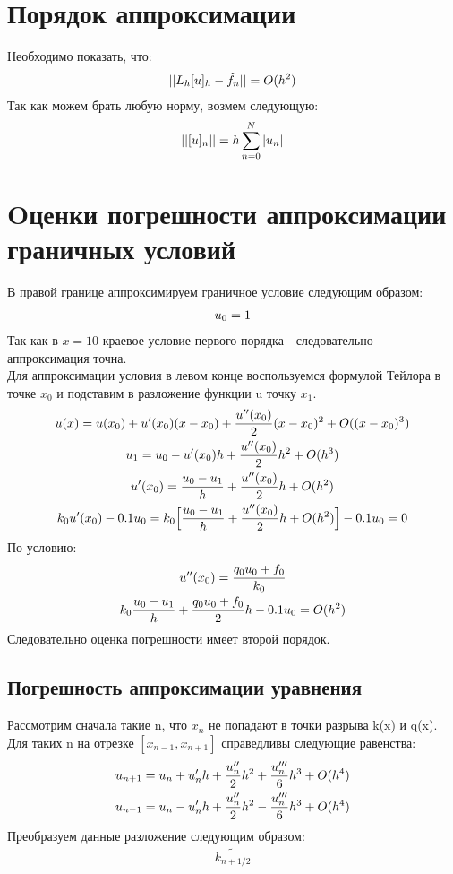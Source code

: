\documentclass[titlepage]{article}
\begin{document}
\section{Порядок аппроксимации}
	Необходимо показать, что:
\begin{gather}
	\notag ||L_h[u]_h - \tilde{f_n}|| = O(h^2)
\end{gather}
Так как можем брать любую норму, возмем следующую:
\begin{gather}
	\notag ||[u]_n|| = h\sum_{n = 0}^{N}|u_n|
\end{gather}
\section{Oценки погрешности аппроксимации граничных условий}
В правой границе аппроксимируем граничное условие следующим образом:
\begin{gather}
	\notag u_0 = 1
\end{gather}
Так как в $x = 10$ краевое условие первого порядка - следовательно аппроксимация точна.\\
Для аппроксимации условия в левом конце воспользуемся формулой Тейлора в точке $x_0$ и подставим в разложение функции u точку $x_1$.
\begin{gather}
	\notag u(x) = u(x_0) + u'(x_0)(x - x_0) + \frac{u''(x_0)}{2}(x - x_0)^2 + O((x -x_0)^3) \\
	\notag u_1 = u_0 - u'(x_0)h + \frac{u''(x_0)}{2}h^2 + O(h^3)\\
	\notag u'(x_0) = \frac{u_0 - u_1}{h} + \frac{u''(x_0)}{2}h + O(h^2)\\
	\notag k_0u'(x_0) - 0.1u_0 = k_0\Big[\frac{u_0 - u_1}{h} + \frac{u''(x_0)}{2}h + O(h^2)\Big] - 0.1u_0 = 0 
\end{gather}
По условию:
\begin{gather}
	\notag u''(x_0) = \frac{q_0u_0 + f_0}{k_0}\\
	\notag k_0\frac{u_0 - u_1}{h} + \frac{q_{0}u_0 + f_0}{2}h - 0.1u_0 = O(h^2)
\end{gather}
Следовательно оценка погрешности имеет второй порядок.
\subsection{Погрешность аппроксимации уравнения}
Рассмотрим сначала такие n, что $x_n$ не попадают в точки разрыва k(x) и q(x). Для таких n на отрезке $[x_{n -1}, x_{n + 1}]$ справедливы следующие равенства:
\begin{gather}
	\notag u_{n + 1} = u_{n} + u'_nh + \frac{u''_n}{2}h^2 + \frac{u'''_n}{6}h^3 + O(h^4)\\
	\notag u_{n - 1} = u_n - u'_nh + \frac{u''_n}{2}h^2 - \frac{u'''_n}{6}h^3 + O(h^4)
\end{gather}
Преобразуем данные разложение следующим образом:
\begin{gather}
	\tilde{k_{n+1/2}}
\end{gather}
\end{document}
